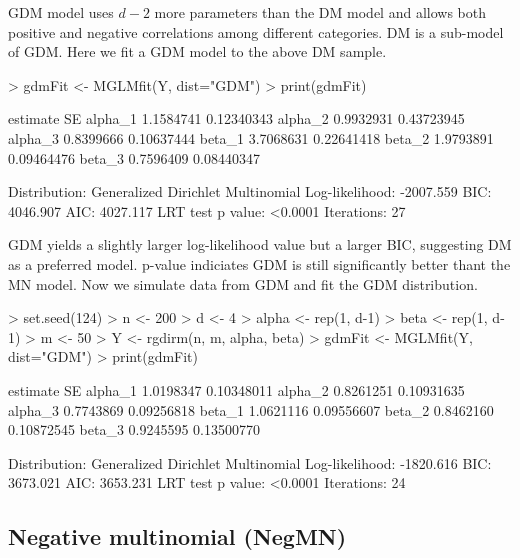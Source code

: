 \documentclass[a4paper]{article}
\begin{document}
GDM model uses $d-2$ more parameters than the DM model and allows both positive and negative correlations among different categories. DM is a sub-model of GDM. Here we fit a GDM model to the above DM sample.
\begin{Schunk}
\begin{Sinput}
> gdmFit <- MGLMfit(Y, dist="GDM")
> print(gdmFit)
\end{Sinput}
\begin{Soutput}
         estimate         SE
alpha_1 1.1584741 0.12340343
alpha_2 0.9932931 0.43723945
alpha_3 0.8399666 0.10637444
beta_1  3.7068631 0.22641418
beta_2  1.9793891 0.09464476
beta_3  0.7596409 0.08440347

Distribution: Generalized Dirichlet Multinomial
Log-likelihood: -2007.559
BIC: 4046.907
AIC: 4027.117
LRT test p value: <0.0001
Iterations: 27
\end{Soutput}
\end{Schunk}
GDM yields a slightly larger log-likelihood value but a larger BIC, suggesting DM as a preferred model. p-value indiciates GDM is still significantly better thant the MN model. %
Now we simulate data from GDM and fit the GDM distribution.
\begin{Schunk}
\begin{Sinput}
> set.seed(124)
> n <- 200
> d <- 4
> alpha <- rep(1, d-1)
> beta <- rep(1, d-1)
> m <- 50
> Y <- rgdirm(n, m, alpha, beta)
> gdmFit <- MGLMfit(Y, dist="GDM")
> print(gdmFit)
\end{Sinput}
\begin{Soutput}
         estimate         SE
alpha_1 1.0198347 0.10348011
alpha_2 0.8261251 0.10931635
alpha_3 0.7743869 0.09256818
beta_1  1.0621116 0.09556607
beta_2  0.8462160 0.10872545
beta_3  0.9245595 0.13500770

Distribution: Generalized Dirichlet Multinomial
Log-likelihood: -1820.616
BIC: 3673.021
AIC: 3653.231
LRT test p value: <0.0001
Iterations: 24
\end{Soutput}
\end{Schunk}

\subsection{Negative multinomial (NegMN)}
\end{document}
